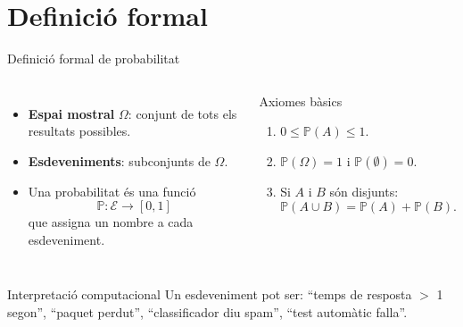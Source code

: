 \documentclass[10pt,aspectratio=169]{beamer}
\newcommand{\important}[1]{\textcolor{UABGreen}{\textbf{#1}}}
\newcommand{\Prob}{\mathbb{P}}
\begin{document}
\section{Definició formal}

\begin{frame}{Definició formal de probabilitat}
\begin{columns}[T]
\begin{itemize}
  \item \important{Espai mostral} $\Omega$: conjunt de tots els resultats possibles.
  \item \important{Esdeveniments}: subconjunts de $\Omega$.
  \item Una probabilitat és una funció
  \[
  \Prob: \mathcal{E} \longrightarrow [0,1]
  \]
  que assigna un nombre a cada esdeveniment.
\end{itemize}
\begin{block}{Axiomes bàsics}
\begin{enumerate}
  \item $0\leq \Prob(A)\leq 1$.
  \item $\Prob(\Omega)=1$ i $\Prob(\emptyset)=0$.
  \item Si $A$ i $B$ són disjunts:
  \[
  \Prob(A\cup B)=\Prob(A)+\Prob(B).
  \]
\end{enumerate}
\end{block}
\end{columns}
\vspace{0.1cm}
\begin{alertblock}{Interpretació computacional}
Un esdeveniment pot ser: ``temps de resposta $>$ 1 segon'', ``paquet perdut'', ``classificador diu spam'', ``test automàtic falla''.
\end{alertblock}
\end{frame}
\end{document}
